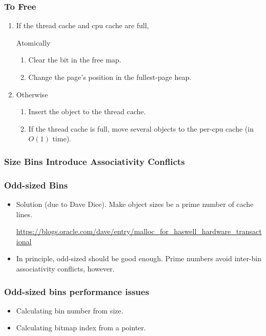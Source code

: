 \documentclass[xcolor=dvipsnames,14pt]{beamer}
\begin{document}
\begin{frame}
\frametitle{To Free}
\begin{enumerate}
\item If the thread cache and cpu cache are full, 

 Atomically
 \begin{enumerate}
 \item Clear the bit in the free map.
 \item Change the page's position in the fullest-page heap.
 \end{enumerate}
\item Otherwise 
 \begin{enumerate}
 \item Insert the object to the thread cache.
 \item If the thread cache is full, move several objects to the per-cpu cache (in $O(1)$ time).
 \end{enumerate}
\end{enumerate}
\end{frame}

\begin{frame}[fragile]
\frametitle{Size Bins Introduce Associativity Conflicts}

\end{frame}

\begin{frame}
\frametitle{Odd-sized Bins}

\begin{itemize}
\item Solution (due to Dave Dice).  Make object sizes be a prime number of cache lines.

\url{https://blogs.oracle.com/dave/entry/malloc_for_haswell_hardware_transactional}

\item In principle, odd-sized should be good enough.  Prime numbers avoid inter-bin associativity conflicts, however.
\end{itemize}

\end{frame}

\begin{frame}
\frametitle{Odd-sized bins performance issues}

\begin{itemize}
\item Calculating bin number from size.
\item Calculating bitmap index from a pointer.
\end{itemize}
\end{frame}
\end{document}
